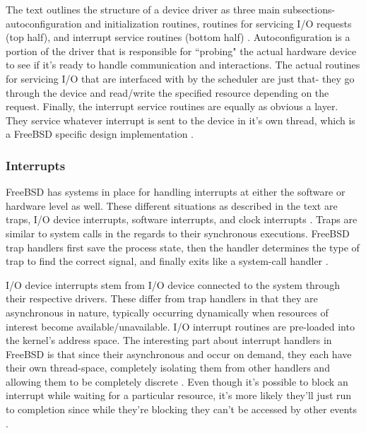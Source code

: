\documentclass[10pt,draftclsnofoot,onecolumn]{IEEEtran}
\begin{document}
\par The text outlines the structure of a device driver as three main subsections- autoconfiguration and initialization routines, routines for servicing I/O requests (top half), and interrupt service routines (bottom half) \cite{bsd:1}.
Autoconfiguration is a portion of the driver that is responsible for ``probing" the actual hardware device to see if it's ready to handle communication and interactions.
The actual routines for servicing I/O that are interfaced with by the scheduler are just that- they go through the device and read/write the specified resource depending on the request.
Finally, the interrupt service routines are equally as obvious a layer.
They service whatever interrupt is sent to the device in it's own thread, which is a FreeBSD specific design implementation \cite{bsd:1}.

\subsubsection{Interrupts}
\label{sub:Interrupts FreeBSD}
\par FreeBSD has systems in place for handling interrupts at either the software or hardware level as well.
These different situations as described in the text are traps, I/O device interrupts, software interrupts, and clock interrupts \cite{bsd:1}.
Traps are similar to system calls in the regards to their synchronous executions.
FreeBSD trap handlers first save the process state, then the handler determines the type of trap to find the correct signal, and finally exits like a system-call handler \cite{bsd:1}.

\par I/O device interrupts stem from I/O device connected to the system through their respective drivers.
These differ from trap handlers in that they are asynchronous in nature, typically occurring dynamically when resources of interest become available/unavailable.
I/O interrupt routines are pre-loaded into the kernel's address space.
The interesting part about interrupt handlers in FreeBSD is that since their asynchronous and occur on demand, they each have their own thread-space, completely isolating them from other handlers and allowing them to be completely discrete \cite{bsd:1}.
Even though it's possible to block an interrupt while waiting for a particular resource, it's more likely they'll just run to completion since while they're blocking they can't be accessed by other events \cite{bsd:1}.
\end{document}
